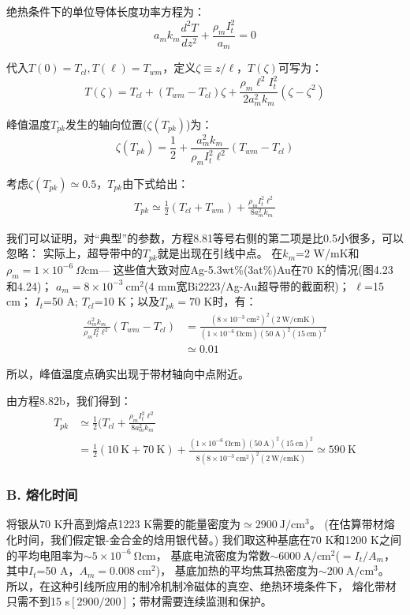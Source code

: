 绝热条件下的单位导体长度功率方程为：
\begin{equation}%
a_mk_m\frac{d^2T}{dz^2}+\frac{\rho_mI_{t}^{2}}{a_m}=0
\end{equation}

代入$T(0)=T_{cl},T(\ell)=T_{wm}$，定义$\zeta\equiv z/\ell$，$T(\zeta)$可写为：
\begin{equation}%
T(\zeta)=T_{cl}+(T_{wm}-T_{cl})\zeta+\frac{\rho_m\ell^2I_{t}^{2}}{2a_{m}^{2}k_m}(\zeta-\zeta^2)
\end{equation}

峰值温度$T_{pk}$发生的轴向位置($\zeta(T_{pk})$)为：
\begin{equation}%
\zeta(T_{pk})=\frac{1}{2}+\frac{a_{m}^{2}k_m}{\rho_mI_{t}^{2}\ell^2}(T_{wm}-T_{cl})
\end{equation}

考虑$\zeta(T_{pk})\simeq 0.5$，$T_{pk}$由下式给出：
\begin{align*}%
T_{pk}\simeq \frac{1}{2}(T_{cl}+T_{wm})+\frac{\rho_mI_{t}^{2}\ell^2}{8a_{m}^{2}k_m} \tag{8.81b}
\end{align*}

我们可以证明，对“典型”的参数，方程8.81等号右侧的第二项是比0.5小很多，可以忽略：
实际上，超导带中的$T_{pk}$就是出现在引线中点。
在$k_m$=2 W/mK和$\rho_m=1\times 10^{-6}\ \Omega$cm---
这些值大致对应Ag-5.3wt\%(3at\%)Au在70 K的情况(图4.23和4.24)；
$a_m=8\times 10^{-3}\ \mathrm{cm^2}$(4 mm宽Bi2223/Ag-Au超导带的截面积)；
$\ell$=15 cm；
$I_t$=50 A;
$T_{cl}$=10 K；以及$T_{pk}=70$ K时，有：
\begin{align*}%
\frac{a_{m}^{2}k_m}{\rho_mI_{t}^{2}\ell^2}(T_{wm}-T_{cl})&=\frac{(8\times 10^{-3}\ \mathrm{cm^2})^2(2\ \mathrm{W/cm K})}{(1\times 10^{-6}\ \mathrm{\Omega cm})(50\ \mathrm{A})^2(15\ \mathrm{cm})^2} \\
&\simeq 0.01
\end{align*}

所以，峰值温度点确实出现于带材轴向中点附近。

由方程8.82b，我们得到：
\begin{align*}%
T_{pk}&\simeq\frac{1}{2}(T_{cl}+\frac{\rho_mI_{t}^{2}\ell^2}{8a_{m}^{2}k_m} \\
&=\frac{1}{2}(10\ \mathrm{K}+70\ \mathrm{K})+\frac{(1\times 10^{-6}\ \mathrm{\Omega cm})(50\ \mathrm{A})^2(15\ \mathrm{cn})^2}{8(8\times 10^{-3}\ \mathrm{cm^2})^2(2\ \mathrm{W/cm K})}\simeq 590\ \mathrm{K}
\end{align*}

\subsubsection*{B. 熔化时间}
将银从70 K升高到熔点1223 K需要的能量密度为$\simeq 2900\ \mathrm{J/cm^3}$。
(在估算带材熔化时间，我们假定银-金合金的焓用银代替。)
我们取这种基底在70 K和1200 K之间的平均电阻率为$\sim 5\times 10^{-6}\ \mathrm{\Omega}$cm，
基底电流密度为常数$\sim 6000\ \mathrm{ A/cm^2}$($=I_t/A_m$，其中$I_t$=50 A，$A_m=0.008\ \mathrm{cm^2}$)，
基底加热的平均焦耳热密度为$\sim 200\ \mathrm{A/cm^3}$。
所以，在这种引线所应用的制冷机制冷磁体的真空、绝热环境条件下，
熔化带材只需不到15 s$[2900/200]$；带材需要连续监测和保护。

